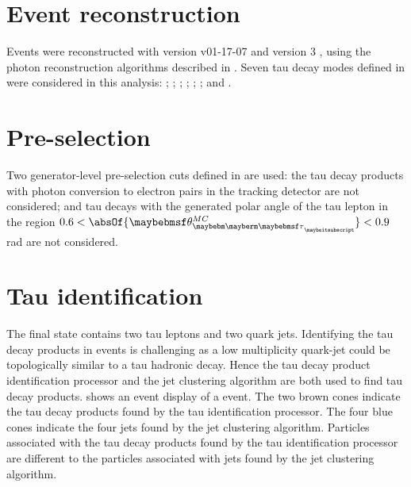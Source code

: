\section{Event reconstruction}


Events were reconstructed with  \ilcsoft version v01-17-07 \cite{Gaede:82475} and \pandora version 3 \cite{Marshall:2015rfa}, using the photon reconstruction algorithms described in . Seven tau decay modes defined in  were considered in this analysis: \tauToElectron; \tauToMuon; \tauToPion; \tauToRho; \tauToAiPhoton; \tauToAiPion; and \tauToThreePion.


\section{Pre-selection}

Two generator-level pre-selection cuts defined in  are used: the tau decay products with photon conversion to electron pairs in the tracking detector are not considered; and tau decays with the generated polar angle of the tau lepton in the region $0.6 < \absOf{\theta_{\Ptau}^{MC}} < 0.9$\,rad are not considered.




\section{Tau identification}
\label{sec:tauHZfindTau}

The \eeZZQQ final state contains two tau leptons and two quark jets. Identifying the tau decay products in \eeZZQQ events is challenging as a low multiplicity quark-jet could be topologically similar  to a tau hadronic decay. Hence the tau decay product identification processor and the jet clustering algorithm are both used to find tau decay products.  shows an event display of a \eeZZQQ event. The two brown cones indicate the tau decay products found by the tau identification processor. The four blue cones indicate the four jets found by the jet clustering algorithm. Particles associated with the tau decay products found by the tau identification processor are different to the particles associated with jets found by the jet clustering algorithm.

